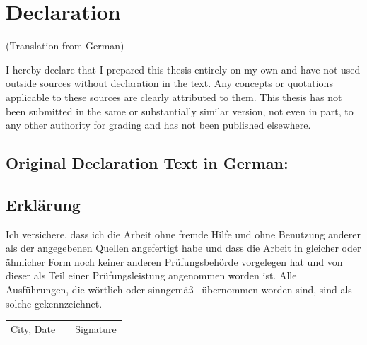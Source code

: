 \clearpage



\ifthenelse{
	\equal{\ausarbeitungsTyp}{\ausarbeitungsTypMaster}
	\OR
	\equal{\ausarbeitungsTyp}{\ausarbeitungsTypDiplom}
	\OR
	\equal{\ausarbeitungsTyp}{\ausarbeitungsTypBachelor}
	}
{
	

	\chapter*{Declaration}\vspace{-24pt}
	
	(Translation from German)\newline
	
	\noindent I hereby declare that I prepared this thesis entirely on my own and have not used outside sources
	without declaration in the text. Any concepts or quotations applicable to these sources are
	clearly attributed to them. This thesis has not been submitted in the same or substantially similar
	version, not even in part, to any other authority for grading and has not been published elsewhere.

	\section*{Original Declaration Text in German:}

	\section*{Erkl\"arung}
	
	Ich versichere, dass ich die Arbeit ohne fremde Hilfe und ohne Benutzung anderer als der
	angegebenen Quellen angefertigt habe und dass die Arbeit in gleicher oder \"ahnlicher Form
	noch keiner anderen Pr\"ufungsbeh\"orde vorgelegen hat und von dieser als Teil einer
	Pr\"ufungsleistung angenommen worden ist. Alle Ausf\"uhrungen, die w\"ortlich oder sinngem\"a\ss~
	\"ubernommen worden sind, sind als solche ge\-kenn\-zeich\-net.\\[27pt]
	
	
	\begin{center}
		\begin{tabular}{l p{} r}
		  \cline{1-1} \cline{3-3}
		  \begin{minipage}[t]{0.4\textwidth}
		    \centering
		    City, Date
			\end{minipage}
			&
			\begin{minipage}[t]{0.2\textwidth}
			\end{minipage}
			&
			\begin{minipage}[t]{0.4\textwidth}
			  \centering
			  Signature
			\end{minipage}
		\end{tabular}
	\end{center}
}
{
}


\tableofcontents



